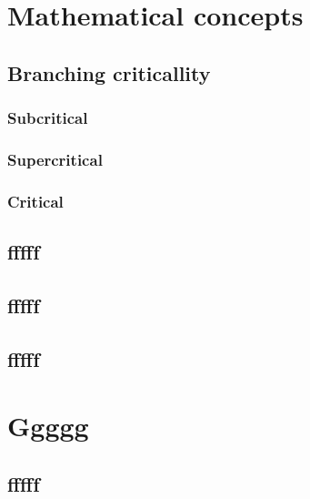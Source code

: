 \section*{Mathematical concepts}



\subsection*{Branching criticallity}


\subsubsection*{Subcritical}


\subsubsection*{Supercritical}


\subsubsection*{Critical}





\subsection*{fffff}



\subsection*{fffff}



\subsection*{fffff}




\section*{Ggggg}



\subsection*{fffff}



